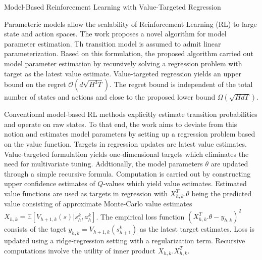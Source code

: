 \documentclass[11pt,letterpaper]{article}
\begin{document}
\begin{center}
  \large{Model-Based Reinforcement Learning with Value-Targeted Regression}
\end{center}

Parameteric models allow the scalability of Reinforcement Learning (RL) to large state and action spaces. The work proposes a novel algorithm for model parameter estimation. Th transition model is assumed to admit linear parameterization. Based on this formulation, the proposed algorithm carried out model parameter estimation by recursively solving a regression problem with target as the latest value estimate. Value-targeted regression yields an upper bound on the regret $\mathcal{O}(d\sqrt{H^{3}T})$. The regret bound is independent of the total number of states and actions and close to the proposed lower bound $\Omega(\sqrt{HdT})$.

Conventional model-based RL methods explicitly estimate transition probabilities and operate on raw states. To that end, the work aims to deviate from this notion and estimates model parameters by setting up a regression problem based on the value function. Targets in regression updates are latest value estimates. Value-targeted formulation yields one-dimensional targets which eliminates the need for multivariate tuning. Addtionally, the model parameters $\theta$ are updated through a simple recursive formula. Computation is carried out by constructing upper confidence estimates of $Q$-values which yield value estimates. Estimated value functions are used as targets in regression with $X_{h,k}^T.\theta$ being the predicted value consisting of approximate Monte-Carlo value estimates $X_{h,k} = \mathbb{E}[V_{h+1,k}(s)|s_{h}^{k},a_{h}^{k}]$. The empirical loss function $(X_{h,k}^{T}.\theta - y_{h,k})^{2}$ consists of the taget $y_{h,k} = V_{h+1,k}(s_{h+1}^{k})$ as the latest target estimates. Loss is updated using a ridge-regression setting with a regularization term. Recursive computations involve the utility of inner product $X_{h,k}.X_{h,k}^{T}$. 
\end{document}
